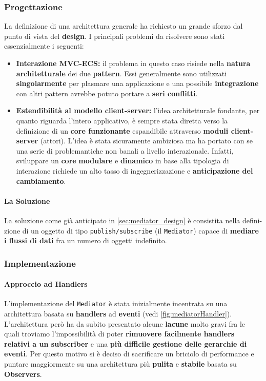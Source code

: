 \subsubsection{Progettazione}
La definizione di una architettura generale ha richiesto un grande sforzo dal punto di vista del \textbf{design}. I principali problemi da risolvere sono stati essenzialmente i seguenti:
\begin{itemize}
	\item{\textbf{Interazione MVC-ECS:}} il problema in questo caso risiede nella \textbf{natura architetturale} dei due \textbf{pattern}. Essi generalmente sono utilizzati \textbf{singolarmente} per plasmare una applicazione e una possibile \textbf{integrazione} con altri pattern avrebbe potuto portare a \textbf{seri conflitti}.
	\item{\textbf{Estendibilità al modello client-server:}} l'idea architetturale fondante, per quanto riguarda l'intero applicativo, è sempre stata diretta verso la definizione di un \textbf{core funzionante} espandibile attraverso \textbf{moduli client-server} (attori). L'idea è stata sicuramente ambiziosa ma ha portato con se una serie di problemantiche non banali a livello interazionale. Infatti, sviluppare un \textbf{core} \textbf{modulare} e \textbf{dinamico} in base alla tipologia di interazione richiede un alto tasso di ingegnerizzazione e \textbf{anticipazione del cambiamento}.
\end{itemize}
\paragraph{La Soluzione}
La soluzione come già anticipato in \ref{sec:mediator_design} è consistita nella defini-zione di un oggetto di tipo \texttt{publish/subscribe} (il \texttt{Mediator}) capace di \textbf{mediare i flussi di dati} fra un numero di oggetti indefinito.

\subsubsection{Implementazione}
\paragraph{Approccio ad Handlers}
\label{subsubsec:mediator_handler_problem}
L'implementazione del \texttt{Mediator} è stata inizialmente incentrata su una architettura basata su \textbf{handlers} ad \textbf{eventi} (vedi \ref{fig:mediatorHandler}). L'architettura però ha da subito presentato alcune \textbf{lacune} molto gravi fra le quali troviamo l'impossibilità di poter \textbf{rimuovere facilmente handlers relativi a un subscriber} e una \textbf{più difficile gestione delle gerarchie di eventi}. Per questo motivo si è deciso di sacrificare un briciolo di performance e puntare maggiormente su una architettura più \textbf{pulita} e \textbf{stabile} basata su \textbf{Observers}.

